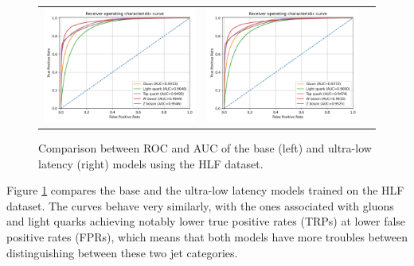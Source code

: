 \begin{figure}[!hpt]
  \centering
  \begin{tabular}{ccc}
      {\includegraphics[width=0.48\columnwidth]{evaluation/ROC_base_hlf.png}} &
      {\includegraphics[width=0.48\columnwidth]{evaluation/ROC_hlf.png}}
  \end{tabular}
  \caption{Comparison between ROC and AUC of the base (left) and ultra-low latency (right) models using the HLF dataset.}
  \label{fig:ROCs-HLF}
\end{figure}

Figure \ref{fig:ROCs-HLF} compares the base and the ultra-low latency models trained on the HLF dataset. The curves behave very similarly, with the ones associated with gluons and light quarks achieving notably lower true positive rates (TRPs) at lower false positive rates (FPRs), which means that both models have more troubles between distinguishing between these two jet categories.

